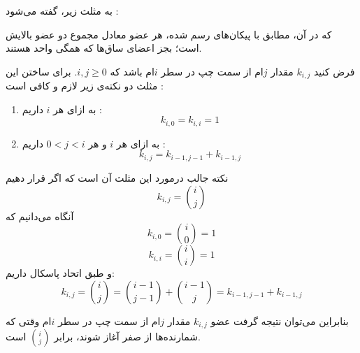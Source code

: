 \begin{DEFINITION}
\p
به مثلث زیر، 
گفته می‌شود :


که در آن، مطابق با پیکان‌های رسم شده، هر عضو معادل مجموع دو عضو بالایش است؛
بجز اعضای ساق‌ها که همگی واحد هستند.
\end{DEFINITION}

\p
فرض کنید
$k_{i,j}$
مقدار 
$j$ام
از سمت چپ در سطر
$i$ام
باشد که $i,j \geq 0$. برای ساختن این مثلث دو نکته‌ی زیر لازم و کافی است :
\begin{enumerate}
  \item 
  به ازای هر
  $i$
  داریم :
    $$k_{i,0} = k_{i,i} = 1$$

  \item 
  به ازای هر 
  $i$ و هر
  $0 < j < i$
  داریم :
    $$k_{i,j} = k_{i-1,j-1} + k_{i-1,j}$$
\end{enumerate}
\p
نکته جالب درمورد این مثلث آن است که اگر قرار دهیم
$$k_{i,j} = {i \choose j}$$
آنگاه می‌دانیم که
$$k_{i,0} = {i \choose 0} = 1$$
$$k_{i,i} = {i \choose i} = 1$$
و طبق اتحاد پاسکال داریم:
$$k_{i,j} = {i \choose j} = {i-1 \choose j-1} + {i-1 \choose j} = k_{i-1,j-1} + k_{i-1,j}$$

بنابراین می‌توان نتیجه گرفت عضو
$k_{i,j}$
مقدار 
$j$ام
از سمت چپ در سطر
$i$ام
وقتی که شمارنده‌ها از صفر آغاز شوند، برابر 
$i \choose j$
است.